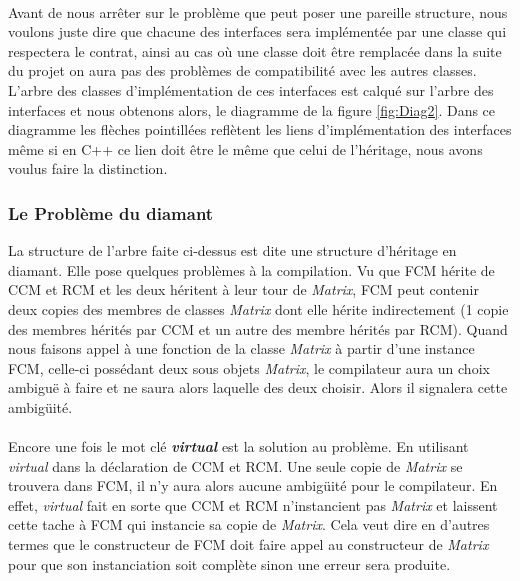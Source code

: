 \documentclass[a4paper, 10pt]{report}
\begin{document}
\paragraph*{}
Avant de nous arrêter sur le problème que peut poser une pareille structure, nous voulons juste dire que chacune 
des interfaces sera implémentée par une classe qui respectera le contrat, ainsi au cas où une classe doit être remplacée 
dans la suite du projet on aura pas des problèmes de compatibilité avec les autres classes.
L’arbre des classes d’implémentation de ces interfaces est calqué sur l’arbre des interfaces et nous obtenons alors, 
le diagramme de la figure \ref{fig:Diag2}.\newline
Dans ce diagramme les flèches pointillées reflètent les liens d’implémentation des interfaces même si en C++ ce lien 
doit être le même que celui de l’héritage, nous avons voulus faire la distinction.

\subsubsection{Le Problème du diamant}
La structure de l’arbre faite ci-dessus est dite une structure d’héritage en diamant. Elle pose quelques problèmes à la 
compilation.\newline
Vu que FCM hérite de CCM et RCM et les deux héritent à leur tour de \textit{Matrix}, FCM peut contenir deux copies des membres 
de classes \textit{Matrix} dont elle hérite indirectement (1 copie des membres hérités par CCM et un autre des membre 
hérités par RCM). Quand nous faisons appel à une fonction de la classe \textit{Matrix} à partir d’une instance FCM, 
celle-ci possédant deux sous objets \textit{Matrix}, le compilateur aura un choix ambiguë à faire et ne saura alors 
laquelle des deux choisir. Alors il signalera cette ambigüité.
\paragraph*{}
Encore une fois le mot clé \textbf{\textit{virtual}} est la solution au problème.  En utilisant \textit{virtual} dans la  
déclaration de CCM et RCM. Une seule copie de \textit{Matrix} se trouvera dans FCM, il n'y aura alors aucune ambigüité pour 
le compilateur.\newline
En effet, \textit{virtual} fait en sorte que CCM et RCM n’instancient pas \textit{Matrix} et laissent cette tache à FCM 
qui instancie sa copie de \textit{Matrix}. Cela veut dire en d’autres termes que le constructeur de FCM doit faire appel 
au constructeur de \textit{Matrix} pour que son instanciation soit complète sinon une erreur sera produite.
\end{document}
